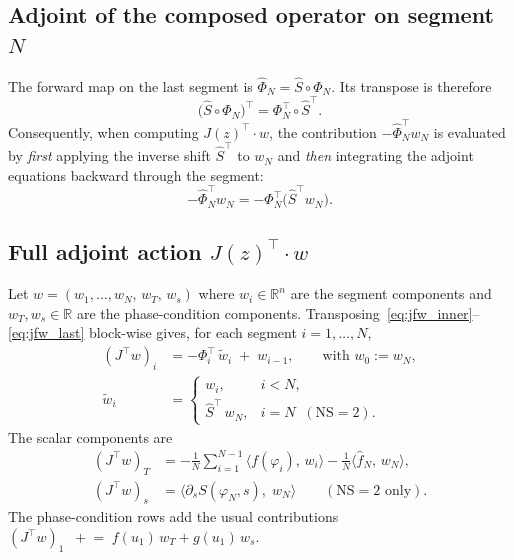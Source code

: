 \documentclass[11pt,a4paper]{article}
\begin{document}
\subsection{Adjoint of the composed operator on segment $N$}

The forward map on the last segment is $\widehat{\Phi}_N = \widehat{S} \circ \Phi_N$.
Its transpose is therefore
\begin{equation}
    \bigl(\widehat{S} \circ \Phi_N\bigr)^{\top}
    = \Phi_N^{\top} \circ \widehat{S}^{\top}.
\end{equation}
Consequently, when computing $J(z)^\top \cdot w$, the contribution
$-\widehat{\Phi}_N^{\top} w_N$ is evaluated by \emph{first} applying the inverse
shift $\widehat{S}^{\top}$ to $w_N$ and \emph{then} integrating the adjoint
equations backward through the segment:
\begin{equation}
    -\widehat{\Phi}_N^{\top} w_N
    = -\Phi_N^{\top}\bigl(\widehat{S}^{\top} w_N\bigr).
\end{equation}

\subsection{Full adjoint action $J(z)^\top \cdot w$}

Let $w = (w_1, \dots, w_N,\, w_T,\, w_s)$ where $w_i \in \mathbb{R}^n$ are the
segment components and $w_T, w_s \in \mathbb{R}$ are the phase-condition components.
Transposing~\eqref{eq:jfw_inner}--\eqref{eq:jfw_last} block-wise gives, for each
segment $i = 1,\dots,N$,
\begin{align}
    (J^\top w)_i &=
        -\Phi_i^{\top}\,\widetilde{w}_i \;+\; w_{i-1},
        \qquad\text{with } w_0 := w_N, \\[4pt]
    \widetilde{w}_i &=
        \begin{cases}
            w_i,                 & i < N, \\[2pt]
            \widehat{S}^{\top}\,w_N, & i = N \;\;(\text{NS}=2).
        \end{cases}
\end{align}
The scalar components are
\begin{align}
    (J^\top w)_T &= -\frac{1}{N}\sum_{i=1}^{N-1}
                     \bigl\langle f(\varphi_i),\, w_i \bigr\rangle
                   -\frac{1}{N}\bigl\langle \widehat{f}_N,\, w_N \bigr\rangle, \\[4pt]
    (J^\top w)_s &= \bigl\langle \partial_s S(\varphi_N, s),\; w_N \bigr\rangle
                   \qquad (\text{NS}=2\text{ only}).
\end{align}
The phase-condition rows add the usual contributions
$(J^\top w)_1 \;\;+\!\!=\; f(u_1)\,w_T + g(u_1)\,w_s$.
\end{document}
